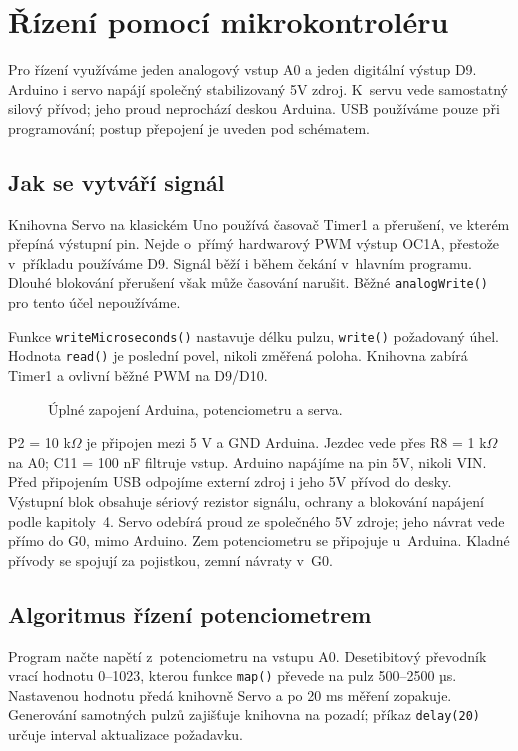 \chapter{Řízení pomocí mikrokontroléru}


Pro řízení využíváme jeden analogový vstup A0 a jeden digitální výstup D9. Arduino i servo napájí společný stabilizovaný 5V zdroj. K~servu vede samostatný silový přívod; jeho proud neprochází deskou Arduina. USB používáme pouze při programování; postup přepojení je uveden pod schématem.

\section{Jak se vytváří signál}
Knihovna Servo na klasickém Uno používá časovač Timer1 a přerušení, ve kterém přepíná výstupní pin. Nejde o~přímý hardwarový PWM výstup OC1A, přestože v~příkladu používáme D9. Signál běží i během čekání v~hlavním programu. Dlouhé blokování přerušení však může časování narušit. Běžné \texttt{analogWrite()} pro tento účel nepoužíváme.~\cite{servoimpl}

Funkce \texttt{writeMicroseconds()} nastavuje délku pulzu, \texttt{write()} požadovaný úhel. Hodnota \texttt{read()} je poslední povel, nikoli změřená poloha. Knihovna zabírá Timer1 a ovlivní běžné PWM na D9/D10.~\cite{servoapi}

\begin{figure}[htbp]\centering
\resizebox{\textwidth}{!}{}
\caption{Úplné zapojení Arduina, potenciometru a serva.}
\label{fig:knob-priklad}
\end{figure}

P2 = 10 k$\Omega$ je připojen mezi 5 V a GND Arduina. Jezdec vede přes R8 = 1 k$\Omega$ na A0; C11 = 100 nF filtruje vstup. Arduino napájíme na pin 5V, nikoli VIN. Před připojením USB odpojíme externí zdroj i jeho 5V přívod do desky.~\cite{uno,arduinoPower} Výstupní blok obsahuje sériový rezistor signálu, ochrany a blokování napájení podle kapitoly~4. Servo odebírá proud ze společného 5V zdroje; jeho návrat vede přímo do G0, mimo Arduino. Zem potenciometru se připojuje u~Arduina. Kladné přívody se spojují za pojistkou, zemní návraty v~G0.

\section{Algoritmus řízení potenciometrem}
Program načte napětí z~potenciometru na vstupu A0. Desetibitový převodník vrací hodnotu 0--1023, kterou funkce \texttt{map()} převede na pulz 500--2500 µs. Nastavenou hodnotu předá knihovně Servo a po 20 ms měření zopakuje. Generování samotných pulzů zajišťuje knihovna na pozadí; příkaz \texttt{delay(20)} určuje interval aktualizace požadavku.

